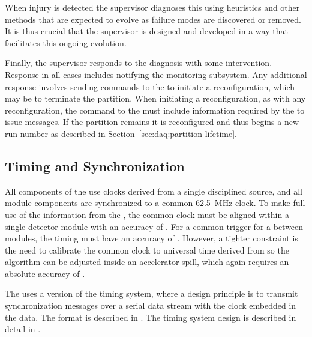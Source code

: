 When injury is detected the supervisor  diagnoses this using heuristics and other methods that are expected to evolve as failure modes are discovered or removed. 
It is thus crucial that the supervisor is designed and developed in a way that facilitates this ongoing evolution.  

Finally, the supervisor responds to the diagnosis with some intervention. 
Response  in all cases includes notifying the monitoring subsystem. 
Any additional response involves sending commands to the  to initiate a reconfiguration,  which may be to terminate the partition.
When initiating a reconfiguration, as with any reconfiguration, the command to the  must include information required by the  to issue  messages. 
If the partition remains it is reconfigured and thus begins a new run number as described in Section~\ref{sec:daq:partition-lifetime}.




\subsection{Timing and Synchronization}
\label{sec:sp-daq:design-timing}

All components of the  use clocks derived from a single
 disciplined source, and all module components are
synchronized to a common \SI{62.5}{MHz} clock. 
To make full use of the information from the , the common clock must be aligned within a single detector %
module with an accuracy of . 
For a common trigger for a  between modules, the timing must have an accuracy of .
However, a tighter constraint is the need to calibrate the common clock to universal time derived from  so the  algorithm can be adjusted inside an accelerator spill, which again requires an absolute accuracy of .

The   uses a version of the  timing
system, where a design principle is to transmit synchronization messages over
a serial data stream with the clock embedded in the data. The format
is described in . The timing system design is
described in detail in .


